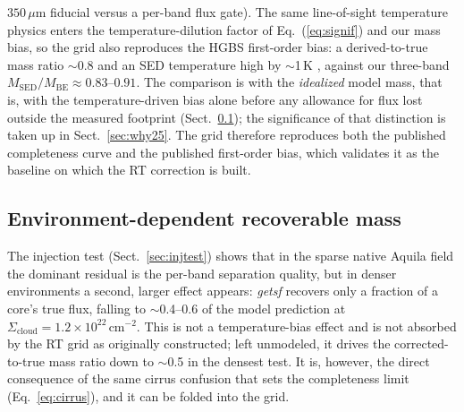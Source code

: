 \documentclass[11pt,a4paper]{article}
\newcommand{\Scloud}{\Sigma_{\mathrm{cloud}}}
\begin{document}
$350\,\mu$m fiducial versus a per-band flux gate). The same line-of-sight
temperature physics enters the temperature-dilution factor of
Eq.~(\ref{eq:signif}) and our mass bias, so the grid also reproduces the HGBS
first-order bias: a derived-to-true mass ratio $\sim$0.8 and an SED
temperature high by $\sim$1\,K \citep[][B.2a,b]{Konyves+2015}, against our
three-band $M_{\mathrm{SED}}/M_{\mathrm{BE}}\approx0.83$--$0.91$. The
comparison is with the \emph{idealized} model mass, that is, with the
temperature-driven bias alone before any allowance for flux lost outside the
measured footprint (Sect.~\ref{sec:recoverable}); the significance of that
distinction is taken up in Sect.~\ref{sec:why25}. The grid therefore
reproduces both the published completeness curve and the published
first-order bias, which validates it as the baseline on which the RT
correction is built.

\subsection{Environment-dependent recoverable mass}
\label{sec:recoverable}

The injection test (Sect.~\ref{sec:injtest}) shows that in the sparse native
Aquila field the dominant residual is the per-band separation quality, but in
denser environments a second, larger effect appears: \emph{getsf} recovers
only a fraction of a core's true flux, falling to $\sim$0.4--0.6 of the model
prediction at $\Scloud=1.2\times10^{22}\,\mathrm{cm^{-2}}$. This is not a
temperature-bias effect and is not absorbed by the RT grid as originally
constructed; left unmodeled, it drives the corrected-to-true mass ratio down
to $\sim$0.5 in the densest test. It is, however, the direct consequence of
the same cirrus confusion that sets the completeness limit
(Eq.~\ref{eq:cirrus}), and it can be folded into the grid.
\end{document}
